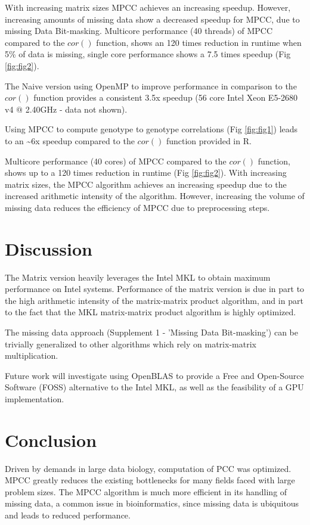 \documentclass{bioinfo}
\begin{document}
With increasing matrix sizes  MPCC achieves an increasing speedup. However,
increasing amounts of missing data show a decreased speedup for MPCC, due
to missing Data Bit-masking. Multicore performance (40 threads) of MPCC
compared to the $cor()$ function, shows an 120 times reduction in runtime
when 5\% of data is missing, single core performance shows a 7.5 times
speedup (Fig \ref{fig:fig2}).

The Naive version using OpenMP to improve performance in comparison to the
$cor()$ function provides a consistent 3.5x speedup (56 core Intel Xeon E5-2680
v4 $@$ 2.40GHz - data not shown).

Using MPCC to compute genotype to genotype correlations (Fig \ref{fig:fig1}) leads to
an \textasciitilde{}6x speedup compared to the $cor()$ function provided in R.

Multicore performance (40 cores) of MPCC compared to the $cor()$ function, shows up to a
120 times reduction in runtime (Fig \ref{fig:fig2}). With increasing matrix sizes,
the MPCC algorithm achieves an increasing speedup due to the increased arithmetic
intensity of the algorithm. However, increasing the volume of missing data reduces the
efficiency of MPCC due to preprocessing steps.

\vspace*{-5mm}
\section{Discussion}
The Matrix version heavily leverages the Intel\textregistered{} MKL to obtain
maximum performance on Intel\textregistered{} systems. Performance of the
matrix version is due in part to the high arithmetic intensity of the
matrix-matrix product algorithm, and in part to the fact that the MKL
matrix-matrix product algorithm is highly optimized.

The missing data approach (Supplement 1 - 'Missing Data Bit-masking') can be
trivially generalized to other algorithms which rely on matrix-matrix multiplication.

Future work will investigate using OpenBLAS to provide a Free and Open-Source
Software (FOSS) alternative to the Intel\textregistered{} MKL, as well as the
feasibility of a GPU implementation.
\vspace*{-5mm}
\section{Conclusion}
Driven by demands in large data biology, computation of PCC was optimized.
MPCC greatly reduces the existing bottlenecks for many fields faced with
large problem sizes. The MPCC algorithm is much more efficient in its handling
of missing data, a common issue in bioinformatics, since missing data is
ubiquitous and leads to reduced performance.
\end{document}
